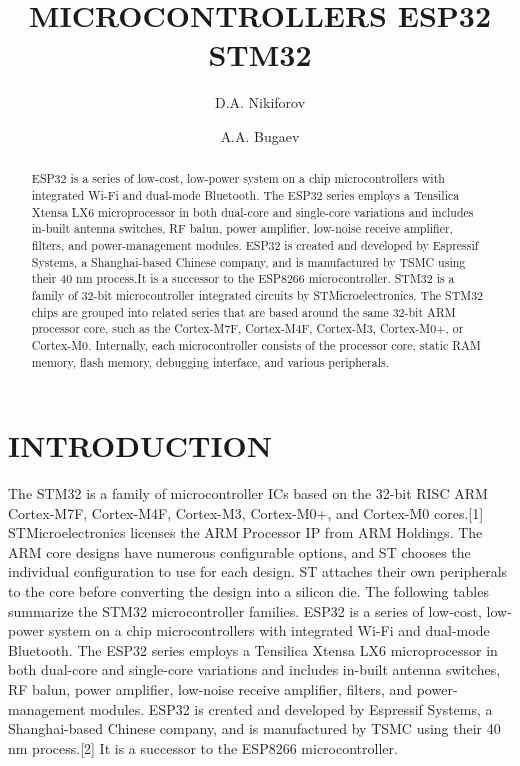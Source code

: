 \documentclass{aip-cp}
\begin{document}
\title{MICROCONTROLLERS ESP32 STM32}

\author[aff1]{D.A. Nikiforov}
\author[aff2]{A.A. Bugaev}



\maketitle

\begin{abstract}
ESP32 is a series of low-cost, low-power system on a chip microcontrollers with integrated Wi-Fi and dual-mode Bluetooth. The ESP32 series employs a Tensilica Xtensa LX6 microprocessor in both dual-core and single-core variations and includes in-built antenna switches, RF balun, power amplifier, low-noise receive amplifier, filters, and power-management modules. ESP32 is created and developed by Espressif Systems, a Shanghai-based Chinese company, and is manufactured by TSMC using their 40 nm process.It is a successor to the ESP8266 microcontroller.
STM32 is a family of 32-bit microcontroller integrated circuits by STMicroelectronics. The STM32 chips are grouped into related series that are based around the same 32-bit ARM processor core, such as the Cortex-M7F, Cortex-M4F, Cortex-M3, Cortex-M0+, or Cortex-M0. Internally, each microcontroller consists of the processor core, static RAM memory, flash memory, debugging interface, and various peripherals.

\end{abstract}

\section{INTRODUCTION}
The STM32 is a family of microcontroller ICs based on the 32-bit RISC ARM Cortex-M7F, Cortex-M4F, Cortex-M3, Cortex-M0+, and Cortex-M0 cores.[1] STMicroelectronics licenses the ARM Processor IP from ARM Holdings. The ARM core designs have numerous configurable options, and ST chooses the individual configuration to use for each design. ST attaches their own peripherals to the core before converting the design into a silicon die. The following tables summarize the STM32 microcontroller families.
ESP32 is a series of low-cost, low-power system on a chip microcontrollers with integrated Wi-Fi and dual-mode Bluetooth. The ESP32 series employs a Tensilica Xtensa LX6 microprocessor in both dual-core and single-core variations and includes in-built antenna switches, RF balun, power amplifier, low-noise receive amplifier, filters, and power-management modules. ESP32 is created and developed by Espressif Systems, a Shanghai-based Chinese company, and is manufactured by TSMC using their 40 nm process.[2] It is a successor to the ESP8266 microcontroller.
\end{document}
